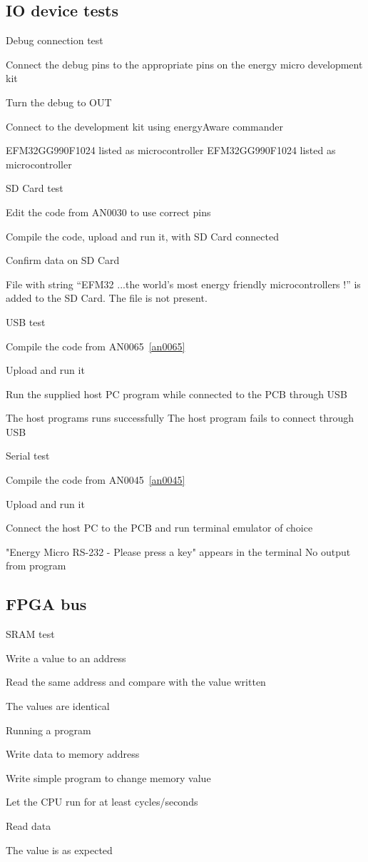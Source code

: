 \subsection{IO device tests}
\test
{Debug connection test}{
    \item{Connect the debug pins to the appropriate pins on the energy micro development kit}
    \item{Turn the debug to OUT}
    \item{Connect to the development kit using energyAware commander}
}{EFM32GG990F1024 listed as microcontroller}
{EFM32GG990F1024 listed as microcontroller}

\test
{SD Card test}{
    \item{Edit the code from AN0030 to use correct pins}
    \item{Compile the code, upload and run it, with SD Card connected}
    \item{Confirm data on SD Card}
}{File with string ``EFM32 ...the world's most energy friendly microcontrollers !'' is added to the SD Card.}
{The file is not present.}

\test
{USB test}{
    \item{Compile the code from AN0065~\ref{an0065}}
    \item{Upload and run it}
    \item{Run the supplied host PC program while connected to the PCB through USB}
}{The host programs runs successfully}
{The host program fails to connect through USB}

\test
{Serial test}{
    \item{Compile the code from AN0045~\ref{an0045}}
    \item{Upload and run it}
    \item{Connect the host PC to the PCB and run terminal emulator of choice}
}{"Energy Micro RS-232 - Please press a key" appears in the terminal}
{No output from program}


\subsection{FPGA bus}
\test
{SRAM test}{
    \item{Write a value to an address}
    \item{Read the same address and compare with the value written}
}{The values are identical}
{}

\test
{Running a program}{
    \item{Write data to memory address}
    \item{Write simple program to change memory value}
    \item{Let the CPU run for at least  cycles/seconds}
    \item{Read data}
}{The value is as expected}
{}
